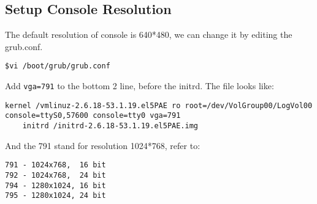 \documentclass{article}
\begin{document}
\subsection{Setup Console Resolution}
The default resolution of console is 640*480, we can change it by editing the grub.conf.
\begin{lstlisting}
$vi /boot/grub/grub.conf
\end{lstlisting}
Add \verb/vga=791/ to the bottom 2 line, before the initrd. The file looks like:
\begin{lstlisting}
kernel /vmlinuz-2.6.18-53.1.19.el5PAE ro root=/dev/VolGroup00/LogVol00 console=ttyS0,57600 console=tty0 vga=791
    initrd /initrd-2.6.18-53.1.19.el5PAE.img
\end{lstlisting}
And the 791 stand for resolution 1024*768, refer to:
\begin{lstlisting}
791 - 1024x768,  16 bit
792 - 1024x768,  24 bit
794 - 1280x1024, 16 bit
795 - 1280x1024, 24 bit
\end{lstlisting}
\end{document}
